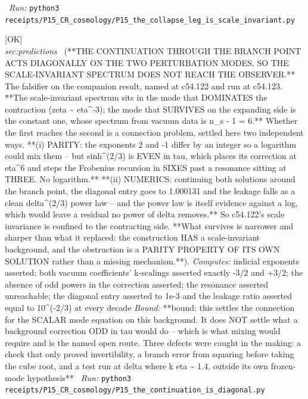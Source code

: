 \begin{description}
\ \emph{Run:} \texttt{python3 receipts/P15\_CR\_cosmology/P15\_the\_collapse\_leg\_is\_scale\_invariant.py}
\item[\rcptlabel{P15_the_continuation_is_diagonal}{P15R83}\textbf{P15R83}\quad\texttt{P15\_the\_continuation\_is\_diagonal}]\hfill\textsf{[OK]}\\
\textit{sec:predictions} \ (**THE CONTINUATION THROUGH THE BRANCH POINT ACTS DIAGONALLY ON THE TWO PERTURBATION MODES, SO THE SCALE-INVARIANT SPECTRUM DOES NOT REACH THE OBSERVER.** The falsifier on the companion result, named at c54.122 and run at c54.123. **The scale-invariant spectrum sits in the mode that DOMINATES the contraction (zeta \textasciitilde{} eta\textasciicircum{}-3); the mode that SURVIVES on the expanding side is the constant one, whose spectrum from vacuum data is n\_s - 1 = 6.** Whether the first reaches the second is a connection problem, settled here two independent ways. **(i) PARITY: the exponents 2 and -1 differ by an integer so a logarithm could mix them -- but sinh\textasciicircum{}(2/3) is EVEN in tau, which places its correction at eta\textasciicircum{}6 and steps the Frobenius recursion in SIXES past a resonance sitting at THREE. No logarithm.** **(ii) NUMERICS: continuing both solutions around the branch point, the diagonal entry goes to 1.000131 and the leakage falls as a clean delta\textasciicircum{}(2/3) power law -- and the power law is itself evidence against a log, which would leave a residual no power of delta removes.** So c54.122's scale invariance is confined to the contracting side. **What survives is narrower and sharper than what it replaced: the construction HAS a scale-invariant background, and the obstruction is a PARITY PROPERTY OF ITS OWN SOLUTION rather than a missing mechanism.**). 
\emph{Computes:} indicial exponents asserted; both vacuum coefficients' k-scalings asserted exactly -3/2 and +3/2; the absence of odd powers in the correction asserted; the resonance asserted unreachable; the diagonal entry asserted to 1e-3 and the leakage ratio asserted equal to 10\textasciicircum{}(-2/3) at every decade
 \emph{Bound:} **bound: this settles the connection for the SCALAR mode equation on this background. It does NOT settle what a background correction ODD in tau would do -- which is what mixing would require and is the named open route. Three defects were caught in the making: a check that only proved invertibility, a branch error from squaring before taking the cube root, and a test run at delta where k eta \textasciitilde{} 1.4, outside its own frozen-mode hypothesis**
\ \emph{Run:} \texttt{python3 receipts/P15\_CR\_cosmology/P15\_the\_continuation\_is\_diagonal.py}

\end{description}
